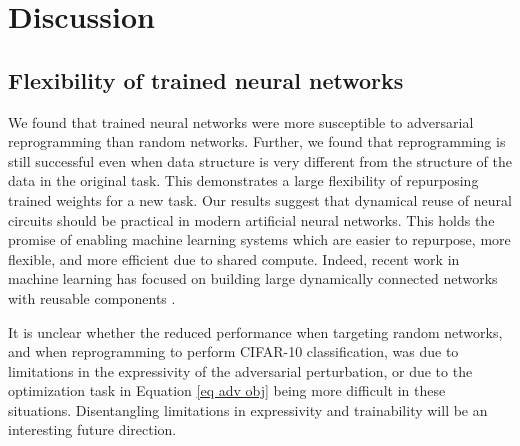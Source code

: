 \documentclass{article}
\begin{document}
\section{Discussion}\label{sec discuss}\subsection{Flexibility of trained neural networks}%
We found that trained neural networks were more susceptible to adversarial reprogramming than random networks. Further, we found that reprogramming is still successful even when data structure is very different from the structure of the data in the original task.
This demonstrates a large flexibility of repurposing trained weights for a new task. 
Our results suggest that dynamical reuse of neural circuits should 
be practical in modern artificial neural networks. 
This holds the promise of enabling machine learning systems which are easier to repurpose, more flexible, and more efficient due to shared compute. 
Indeed, recent work in machine learning has focused on building large dynamically connected networks with reusable components \citep{shazeer2017outrageously}.

It is unclear whether the reduced performance when targeting random networks, and when reprogramming to perform CIFAR-10 classification, 
was due to limitations in the expressivity of the adversarial perturbation,
or due to the optimization task in Equation \ref{eq adv obj} being more difficult in these situations. 
Disentangling limitations in expressivity and trainability will be an interesting future direction.
\end{document}
